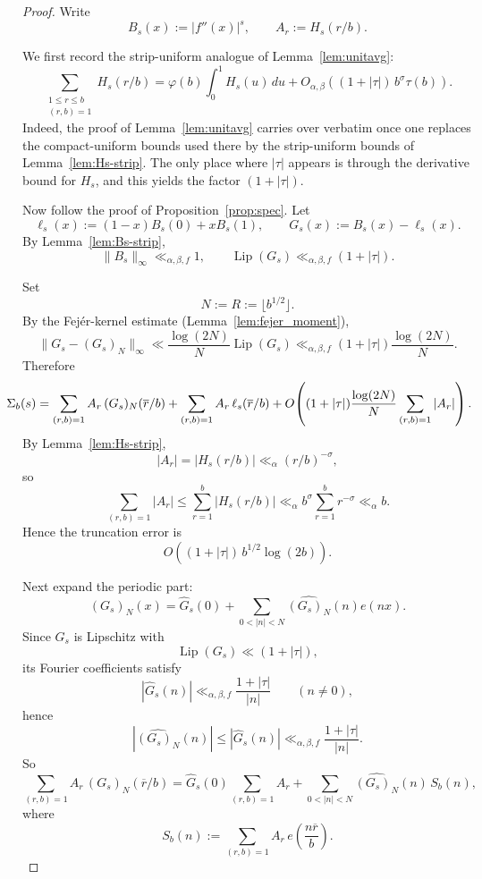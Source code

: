 \documentclass[a4paper,american,11pt]{amsart}
\theoremstyle{plain}
\theoremstyle{definition}
\begin{document}
\begin{proof}
Write
\[
B_s(x):=|f''(x)|^s,
\qquad
A_r:=H_s(r/b).
\]

We first record the strip-uniform analogue of Lemma~\ref{lem:unitavg}:
\begin{equation}
\label{eq:unitavg-strip}
\sum_{\substack{1\le r\le b\\(r,b)=1}} H_s(r/b)
=
\varphi(b)\int_0^1 H_s(u)\,du
+
O_{\alpha,\beta}\!\left((1+|\tau|)\,b^\sigma \tau(b)\right).
\end{equation}
Indeed, the proof of Lemma~\ref{lem:unitavg} carries over verbatim once one replaces the
compact-uniform bounds used there by the strip-uniform bounds of Lemma~\ref{lem:Hs-strip}.
The only place where \(|\tau|\) appears is through the derivative bound for \(H_s\), and this yields
the factor \((1+|\tau|)\).

Now follow the proof of Proposition~\ref{prop:spec}. Let
\[
\ell_s(x):=(1-x)B_s(0)+xB_s(1),
\qquad
G_s(x):=B_s(x)-\ell_s(x).
\]
By Lemma~\ref{lem:Bs-strip},
\[
\|B_s\|_\infty\ll_{\alpha,\beta,f}1,
\qquad
\operatorname{Lip}(G_s)\ll_{\alpha,\beta,f}(1+|\tau|).
\]

Set
\[
N:=R:=\lfloor b^{1/2}\rfloor.
\]
By the Fej\'er-kernel estimate (Lemma~\ref{lem:fejer_moment}),
\[
\|G_s-(G_s)_N\|_\infty
\ll
\frac{\log(2N)}{N}\operatorname{Lip}(G_s)
\ll_{\alpha,\beta,f}
(1+|\tau|)\frac{\log(2N)}{N}.
\]
Therefore
\[\mkern-25mu
\Sigma_b(s)
=
\sum_{(r,b)=1}A_r\,(G_s)_N(\overline r/b)
+
\sum_{(r,b)=1}A_r\,\ell_s(\overline r/b)
+
O\!\left((1+|\tau|)\frac{\log(2N)}{N}\sum_{(r,b)=1}|A_r|\right).
\]
By Lemma~\ref{lem:Hs-strip},
\[
|A_r|=|H_s(r/b)|\ll_\alpha (r/b)^{-\sigma},
\]
so
\[
\sum_{(r,b)=1}|A_r|
\le
\sum_{r=1}^b |H_s(r/b)|
\ll_\alpha
b^\sigma\sum_{r=1}^b r^{-\sigma}
\ll_\alpha b.
\]
Hence the truncation error is
\begin{equation}
\label{eq:trunc-strip}
O\!\left((1+|\tau|)\,b^{1/2}\log(2b)\right).
\end{equation}

Next expand the periodic part:
\[
(G_s)_N(x)=\widehat G_s(0)+\sum_{0<|n|<N}\widehat{(G_s)_N}(n)e(nx).
\]
Since \(G_s\) is Lipschitz with
\[
\operatorname{Lip}(G_s)\ll (1+|\tau|),
\]
its Fourier coefficients satisfy
\[
|\widehat G_s(n)|\ll_{\alpha,\beta,f}\frac{1+|\tau|}{|n|}
\qquad (n\neq0),
\]
hence
\[
|\widehat{(G_s)_N}(n)|\le |\widehat G_s(n)|
\ll_{\alpha,\beta,f}\frac{1+|\tau|}{|n|}.
\]
So
\[
\sum_{(r,b)=1}A_r\,(G_s)_N(\overline r/b)
=
\widehat G_s(0)\sum_{(r,b)=1}A_r
+
\sum_{0<|n|<N}\widehat{(G_s)_N}(n)\,S_b(n),
\]
where
\[
S_b(n):=\sum_{(r,b)=1}A_r\,e\!\left(\frac{n\overline r}{b}\right).
\]


\end{proof}
\end{document}
